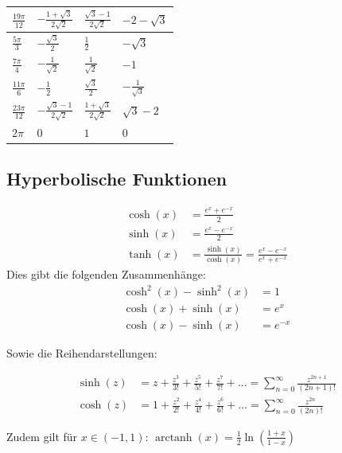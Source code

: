 \documentclass[25pt]{sciposter}
\begin{document}
\begin{multicols}{3}
\begin{center}
\begin{tabular}{ p{5cm} | p{5cm}  | p{5cm} | p{5cm}  }
		$\frac{19\pi}{12}$ & $-\frac{1+\sqrt{3}}{2\sqrt{2}}$ & $\frac{\sqrt{3} -1}{2\sqrt{2}}$ & $-2-\sqrt{3}$\\ \hline
		$\frac{5\pi}{3}$ & $-\frac{\sqrt{3}}{2}$ & $\frac{1}{2}$ & $-\sqrt{3}$\\ \hline
		$\frac{7\pi}{4}$ & $-\frac{1}{\sqrt{2}}$ & $\frac{1}{\sqrt{2}}$ & $-1$\\  \hline
		$\frac{11\pi}{6}$ & $- \frac{1}{2}$ & $\frac{\sqrt{3}}{2}$ & $- \frac{1}{\sqrt{3}}$\\  \hline
		$\frac{23\pi}{12}$ & $-\frac{\sqrt{3} - 1}{2\sqrt{2}}$ & $\frac{1+\sqrt{3}}{2\sqrt{2}}$ & $\sqrt{3} - 2$ \\  \hline
		$2\pi$ & $0$ & $1$ & $0$ \\  \hline
	\end{tabular}
\end{center}


\subsection*{Hyperbolische Funktionen}
\begin{align*}
\cosh(x) &= \frac{e^x + e^{-x}}{2}\\
\sinh(x) &= \frac{e^x - e^{-x}}{2}\\
\tanh(x) &= \frac{\sinh(x)}{\cosh(x)} = \frac{e^x - e^{-x}}{e^x + e^{-x}}
\end{align*}
Dies gibt die folgenden Zusammenhänge:
\begin{align*}
\cosh^2(x) - \sinh^2(x) &= 1\\
\cosh(x) + \sinh(x) &= e^x\\
\cosh(x) - \sinh(x) &= e^{-x}
\end{align*}

Sowie die Reihendarstellungen:

\begin{align*}
\sinh(z)&=z+{\frac {z^{3}}{3!}}+{\frac {z^{5}}{5!}}+{\frac {z^{7}}{7!}}+\dots =\sum _{n=0}^{\infty }{\frac {z^{2n+1}}{(2n+1)!}}\\
\cosh(z)&=1+{\frac {z^{2}}{2!}}+{\frac {z^{4}}{4!}}+{\frac {z^{6}}{6!}}+\dots =\sum _{n=0}^{\infty }{\frac {z^{2n}}{(2n)!}}
\end{align*}

Zudem gilt für $x \in (-1,1)$: $\operatorname{arctanh}(x) = \frac{1}{2} \ln \left( \frac{1+x}{1-x} \right)$










\end{multicols}
\end{document}
